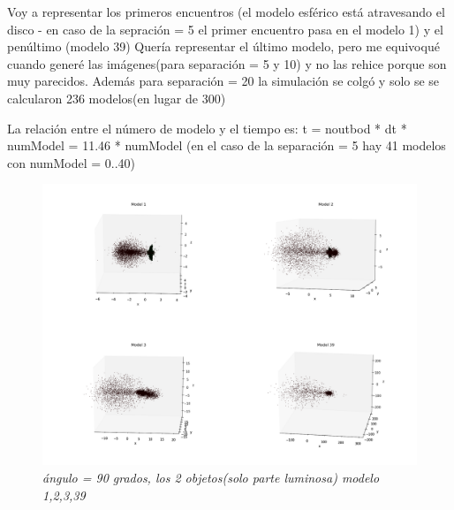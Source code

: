 \documentclass[12pt]{article} %
\renewcommand{\=}[1]{\stackrel{#1}{=}} %
\theoremstyle{definition}
\theoremstyle{remark}
\begin{document}
Voy a representar los primeros encuentros (el modelo esférico está atravesando el disco - en caso de la sepración = 5 el primer encuentro pasa en el modelo 1) y el penúltimo (modelo 39)
\tiny Quería representar el último modelo, pero me equivoqué cuando generé las imágenes(para separación = 5 y 10) y no las rehice porque son muy parecidos. Además para separación = 20 la simulación se colgó y solo se se calcularon 236 modelos(en lugar de 300)

\normalsize
La relación entre el número de modelo y el tiempo es: t = noutbod * dt * numModel = 11.46 *  numModel
(en el caso de la separación = 5 hay 41 modelos con numModel = 0..40)



\begin{figure}[!ht]
 \centering
 \includegraphics[scale=0.2]{90deg_m_sep5.png}
 \caption{\emph{ ángulo = 90 grados, los 2 objetos(solo parte luminosa) modelo 1,2,3,39 }}
\end{figure}
\end{document}
